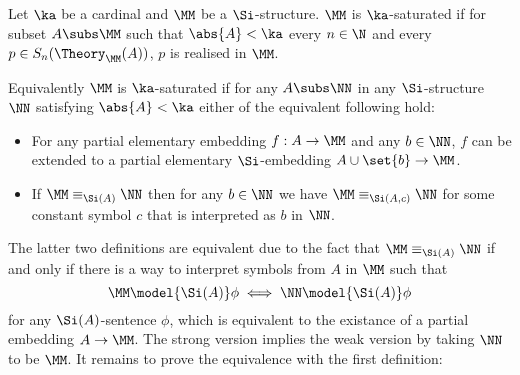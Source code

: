 \begin{dfn}
    Let $\ka$ be a cardinal and $\MM$ be a $\Si$-structure. 
    $\MM$ is $\ka$-saturated if for subset $A \subs \MM$
    such that $\abs{A} < \ka$
    every $n \in \N$ and every $p \in S_n(\Theory_\MM(A))$,
    $p$ is realised in $\MM$.

    Equivalently $\MM$ is $\ka$-saturated
    if for any $A \subs \NN$ in any $\Si$-structure $\NN$ 
    satisfying $\abs{A} < \ka$ either of the equivalent
    following hold:
    \begin{itemize}
        \item For any partial elementary embedding $f : A \to \MM$ and 
            any $b \in \NN$, 
            $f$ can be extended to a partial elementary $\Si$-embedding 
            $A \cup \set{b} \to \MM$.
        \item If $\MM \equiv_{\Si(A)} \NN$ then for any $b \in \NN$ we have 
            $\MM \equiv_{\Si(A,c)} \NN$ for some constant symbol $c$ that 
            is interpreted as $b$ in $\NN$.
    \end{itemize}

    The latter two definitions are equivalent due to the fact that 
    $\MM \equiv_{\Si(A)} \NN$ if and only if 
    there is a way to interpret symbols from $A$ in $\MM$ such that 
    \[\MM \model{\Si(A)} \phi \iff \NN \model{\Si(A)} \phi\] 
    for any $\Si(A)$-sentence $\phi$, 
    which is equivalent to the existance of a partial embedding $A \to \MM$. 
    The strong version implies the weak version by taking $\NN$ to be 
    $\MM$. 
    It remains to prove the equivalence with the first definition:
\end{dfn}
